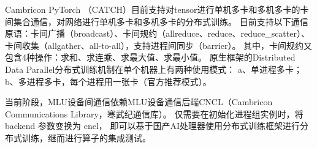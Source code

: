 


Cambricon PyTorch （CATCH）目前支持对tensor进行单机多卡和多机多卡的卡间集合通信，对网络进行单机多卡和多机多卡的分布式训练。
目前支持以下通信原语：卡间广播（broadcast）、卡间规约（allreduce、reduce、reduce\_scatter）、
卡间收集（allgather、all-to-all），支持进程间同步（barrier）。
其中，卡间规约又包含4种操作：求和、求连乘、求最大值、求最小值。
原生框架的Distributed Data Parallel分布式训练机制在单个机器上有两种使用模式：
a、单进程多卡；b、多进程多卡，每个进程用一张卡（官方推荐模式）。

当前阶段，MLU设备间通信依赖MLU设备通信后端CNCL（Cambricon Communications Library，寒武纪通信库）。
仅需要在初始化进程组实例时，将backend 参数变换为 cncl，
即可以基于国产AI处理器使用分布式训练框架进行分布式训练，继而进行算子的集成测试。





